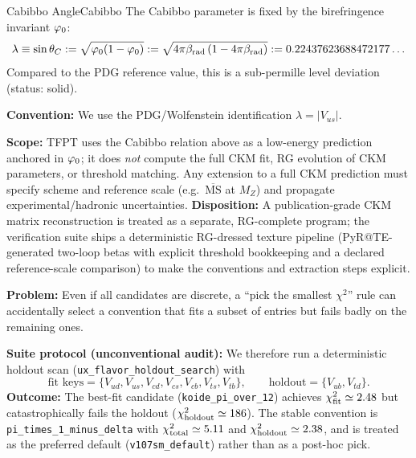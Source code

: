 \begin{corollary}{Cabibbo Angle}{Cabibbo}
The Cabibbo parameter is fixed by the birefringence invariant $\varphi_0$:
\begin{equation}
\lambda \equiv \sin\theta_C
:= \sqrt{\varphi_0(1-\varphi_0)}
:= \sqrt{4\pi\beta_{\text{rad}}\left(1-4\pi\beta_{\text{rad}}\right)}
:= 0.22437623688472177\ldots
\end{equation}
Compared to the PDG reference value, this is a sub-permille level deviation (status: solid).
\end{corollary}

\begin{tcolorbox}[colback=gray!5, colframe=gray!60, 
    title={\textbf{CKM Conventions and Scale (Clarification)}}, fonttitle=\bfseries\small]
\textbf{Convention:} We use the PDG/Wolfenstein identification $\lambda = |V_{us}|$.

\textbf{Scope:} TFPT uses the Cabibbo relation above as a low-energy prediction anchored in $\varphi_0$; it does \emph{not} compute the full CKM fit, RG evolution of CKM parameters, or threshold matching.
Any extension to a full CKM prediction must specify scheme and reference scale (e.g.\ $\overline{\mathrm{MS}}$ at $M_Z$) and propagate experimental/hadronic uncertainties.
\textbf{Disposition:} A publication-grade CKM matrix reconstruction is treated as a separate, RG-complete program; the verification suite ships a deterministic RG-dressed texture pipeline (PyR@TE-generated two-loop betas with explicit threshold bookkeeping and a declared reference-scale comparison) to make the conventions and extraction steps explicit.
\end{tcolorbox}

\begin{tcolorbox}[colback=gray!5, colframe=gray!60,
    title={\textbf{Convention Lock (Holdout Protocol; avoids ``convention shopping'')}}, fonttitle=\bfseries\small]
\textbf{Problem:} Even if all candidates are discrete, a ``pick the smallest $\chi^2$'' rule can accidentally select a convention that fits a subset of entries but fails badly on the remaining ones.

\textbf{Suite protocol (unconventional audit):} We therefore run a deterministic holdout scan (\texttt{ux\_flavor\_holdout\_search}) with
\[
\text{fit keys}=\{V_{ud},V_{us},V_{cd},V_{cs},V_{cb},V_{ts},V_{tb}\},\qquad
\text{holdout}=\{V_{ub},V_{td}\}.
\]
\textbf{Outcome:} The best-fit candidate (\texttt{koide\_pi\_over\_12}) achieves $\chi^2_{\rm fit}\simeq 2.48$ but catastrophically fails the holdout ($\chi^2_{\rm holdout}\simeq 186$). The stable convention is \texttt{pi\_times\_1\_minus\_delta} with $\chi^2_{\rm total}\simeq 5.11$ and $\chi^2_{\rm holdout}\simeq 2.38$, and is treated as the preferred default (\texttt{v107sm\_default}) rather than as a post-hoc pick.
\end{tcolorbox}

